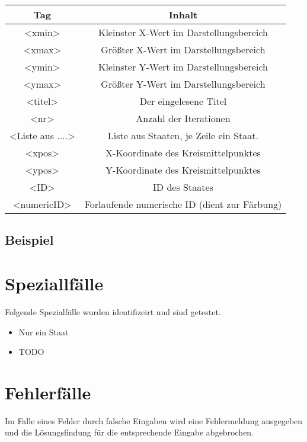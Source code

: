 \begin{center}
    \begin{tabular}{ c c }
        Tag & Inhalt  \\
        \hline
        <xmin> & Kleinster X-Wert im Darstellungsbereich  \\
        <xmax> & Größter X-Wert im Darstellungsbereich  \\
        <ymin> & Kleinster Y-Wert im Darstellungsbereich  \\
        <ymax> & Größter Y-Wert im Darstellungsbereich  \\
        <titel> & Der eingelesene Titel  \\
        <nr> & Anzahl der Iterationen  \\
        <Liste aus ....> & Liste aus Staaten, je Zeile ein Staat. \\
        <xpos> & X-Koordinate des Kreismittelpunktes  \\
        <ypos> & Y-Koordinate des Kreismittelpunktes \\
        <ID> & ID des Staates  \\
        <numericID> & Forlaufende numerische ID (dient zur Färbung)  \\
    \end{tabular}
    \end{center}

\subsection{Beispiel}



\section{Speziallfälle}

Folgende Spezialfälle wurden identifizeirt und sind getestet.

\begin{itemize}
    \item Nur ein Staat
    \item TODO
\end{itemize}

\section{Fehlerfälle}

Im Falle eines Fehler durch falsche Eingaben wird eine Fehlermeldung ausgegeben und die Lösungsfindung für die entsprechende Eingabe abgebrochen.

